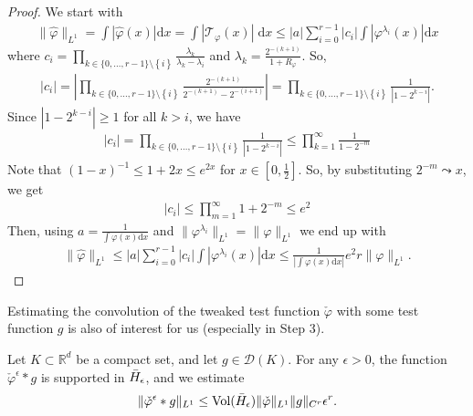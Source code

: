 \begin{proof}
    We start with 
    \begin{align*}
        \lVert \hat \varphi \rVert_{L^1} = \int |\hat \varphi(x)| \mathrm{d}x = \int |\mathcal{T}_{\varphi}(x)| \; \mathrm{d}x \leq |a| \sum^{r-1}_{i=0} |c_i| \int |\varphi^{\lambda_i}(x)| \mathrm{d}x
    \end{align*}
    where \(c_i = \prod_{k \in \{0,\ldots,r-1\} \setminus\left\{ i \right\} } \frac{\lambda_k}{\lambda_k - \lambda_i}\) and \(\lambda_k = \frac{2^{-(k+1)}}{1+R_\varphi}\). So, 
    \begin{align*}
        |c_i| = \left|\prod_{k \in \{0,\ldots,r-1\} \setminus\left\{ i \right\} } \frac{2^{-(k+1)}}{2^{-(k+1)} - 2^{-(i+1)}}\right| = \prod_{k \in \{0,\ldots,r-1\} \setminus\left\{ i \right\} } \frac{1}{|1 - 2^{k - i}|}.
    \end{align*} 
    Since \(|1 - 2^{k - i}| \geq 1\) for all \(k > i\), we have   
    \begin{align*}
        |c_i| = \prod_{k \in \{0,\ldots,r-1\} \setminus\left\{ i \right\} } \frac{1}{|1 - 2^{k - i}|} \leq \prod^\infty_{k=1} \frac{1}{1 - 2^{-m}}
    \end{align*}
    Note that \((1-x)^{-1} \leq 1 + 2x \leq e^{2x}\) for \(x \in [0,\frac{1}{2}]\). So, by substituting \(2^{-m} \leadsto x\), we get 
    \begin{align}\label{jsknfjkewfwhiru}
        |c_i| \leq \prod^\infty_{m=1} 1 + 2^{-m} \leq e^2
    \end{align}
    Then, using \(a = \frac{1}{\int \varphi(x)\mathrm{d}x}\) and \( \lVert \varphi^{\lambda_i} \rVert_{L^1} =  \lVert \varphi \rVert_{L^1} \)  we end up with 
    \begin{align*}
        \lVert \hat \varphi \rVert_{L^1} \leq |a| \sum^{r-1}_{i=0} |c_i| \int |\varphi^{\lambda_i}(x)| \mathrm{d}x \leq \frac{1}{|\int \varphi(x) \mathrm{d}x|} e^2r \lVert \varphi \rVert_{L^1}.
    \end{align*}
\end{proof}

Estimating the convolution of the tweaked test function \(\check \varphi\) with some test function \(g\) is also of interest for us (especially in Step 3). 

\begin{lemma}\label{step3:lemma}
    Let \(K \subset \mathbb{R}^d\) be a compact set, and let \(g \in \mathcal{D}(K)\). For any \(\epsilon > 0\), the function \(\check \varphi^\epsilon * g\) is supported in \(\bar{H}_{\epsilon}\), and we estimate     
    \begin{align*}
        \lVert \check \varphi^{\epsilon} * g \rVert_{L^1} \leq \mathrm{Vol}(\bar{H}_{\epsilon})  \lVert \check \varphi \rVert_{L^1} \lVert g \rVert_{C^r} \epsilon^r.
    \end{align*}
\end{lemma}

